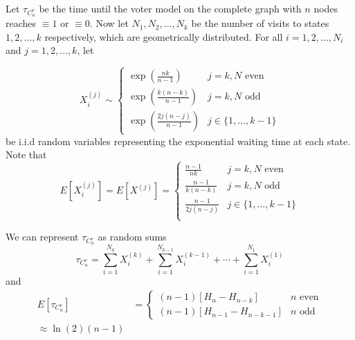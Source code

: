 \begin{theorem}
Let $\tau_{C_n^{v}}$ be the time until the voter model on the complete graph with $n$ nodes reaches $\equiv 1$ or $\equiv 0$.
Now let $N_1, N_2, \ldots, N_k$ be the number of visits to states $1, 2, \ldots, k$ respectively, which are geometrically distributed.
For all $i = 1,2,\ldots, N_i$ and $j = 1,2,\ldots, k$, let 

$$
X_i^{(j)} \sim \begin{cases}
  \exp\left(\displaystyle \frac{nk}{n - 1}\right) & j = k, N \text{ even}\\[10pt]
  \exp\left(\displaystyle\frac{k (n - k)}{n - 1}\right) & j = k, N \text{ odd}\\[10pt]
  \exp\left(\displaystyle \frac{2j (n - j)}{n - 1}\right) & j \in \{1, \ldots, k-1\}
\end{cases}
$$
be i.i.d random variables representing the exponential waiting time at each state. Note that
$$
E[X_i^{(j)}] = E[X^{(j)}] = \begin{cases}
  \displaystyle \frac{n - 1}{nk} & j = k, N \text{ even}\\[10pt]
  \displaystyle \frac{n - 1}{k (n - k)} & j = k, N \text{ odd}\\[10pt]
  \displaystyle \frac{n - 1}{2j (n - j)} & j \in \{1,\ldots, k - 1\}\\
\end{cases}
$$

We can represent $\tau_{C_n^{v}}$ as random sums
\begin{equation}\label{eq:wait_contact_sum_voter}
    \tau_{C_n^{v}} = \sum_{i = 1}^{N_k} X_i^{(k)} + \sum_{i = 1}^{N_{k - 1}} X_i^{(k - 1)} + \cdots + \sum_{i = 1}^{N_1} X_i^{(1)}
\end{equation}
and
\begin{align*}
E[\tau_{C_n^{v}}] &= \begin{cases}
    (n - 1) \left[H_{n} - H_{n - k}\right] & n \text{ even}\\
    (n - 1) \left[H_{n - 1} - H_{n - k - 1}\right] & n \text{ odd}
\end{cases}\\
    \approx \ln(2) (n - 1)
\end{align*}
\end{theorem}

